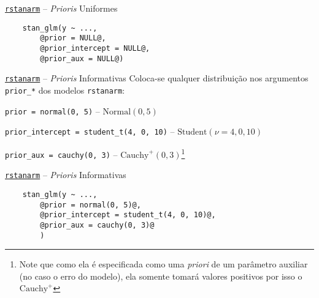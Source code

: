 \begin{frame}[fragile]{\href{http://mc-stan.org/rstanarm/}{\texttt{rstanarm}} -- \textit{Prioris} Uniformes}
	\begin{lstlisting}
    stan_glm(y ~ ...,
        @prior = NULL@,
        @prior_intercept = NULL@,
        @prior_aux = NULL@)
    \end{lstlisting}
\end{frame}

\begin{frame}{\href{http://mc-stan.org/rstanarm/}{\texttt{rstanarm}} -- \textit{Prioris} Informativas}
	Coloca-se qualquer distribuição nos argumentos
	\lstinline!prior_*! dos modelos \texttt{rstanarm}:
	\begin{vfilleditems}
		\item \lstinline!prior = normal(0, 5)! -- $\text{Normal}(0, 5)$
		\item \lstinline!prior_intercept = student_t(4, 0, 10)! -- $\text{Student}(\nu=4, 0, 10)$
		\item  \lstinline!prior_aux = cauchy(0, 3)! -- $\text{Cauchy}^+(0, 3)$\footnote{Note que como ela é especificada como uma \textit{priori} de um parâmetro auxiliar (no caso o erro do modelo), ela somente tomará valores positivos por isso o $\text{Cauchy}^+$}
	\end{vfilleditems}
\end{frame}

\begin{frame}[fragile]{\href{http://mc-stan.org/rstanarm/}{\texttt{rstanarm}} -- \textit{Prioris} Informativas}
	\begin{lstlisting}
    stan_glm(y ~ ...,
        @prior = normal(0, 5)@,
        @prior_intercept = student_t(4, 0, 10)@,
        @prior_aux = cauchy(0, 3)@
        )
    \end{lstlisting}
\end{frame}

